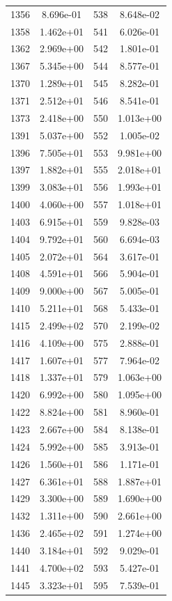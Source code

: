 \documentclass[12pt]{article}
\begin{document}
\begin{longtable}{@{}cccc@{}}
1356 & 8.696e-01 & 538 & 8.648e-02 \\
1358 & 1.462e+01 & 541 & 6.026e-01 \\
1362 & 2.969e+00 & 542 & 1.801e-01 \\
1367 & 5.345e+00 & 544 & 8.577e-01 \\
1370 & 1.289e+01 & 545 & 8.282e-01 \\
1371 & 2.512e+01 & 546 & 8.541e-01 \\
1373 & 2.418e+00 & 550 & 1.013e+00 \\
1391 & 5.037e+00 & 552 & 1.005e-02 \\
1396 & 7.505e+01 & 553 & 9.981e+00 \\
1397 & 1.882e+01 & 555 & 2.018e+01 \\
1399 & 3.083e+01 & 556 & 1.993e+01 \\
1400 & 4.060e+00 & 557 & 1.018e+01 \\
1403 & 6.915e+01 & 559 & 9.828e-03 \\
1404 & 9.792e+01 & 560 & 6.694e-03 \\
1405 & 2.072e+01 & 564 & 3.617e-01 \\
1408 & 4.591e+01 & 566 & 5.904e-01 \\
1409 & 9.000e+00 & 567 & 5.005e-01 \\
1410 & 5.211e+01 & 568 & 5.433e-01 \\
1415 & 2.499e+02 & 570 & 2.199e-02 \\
1416 & 4.109e+00 & 575 & 2.888e-01 \\
1417 & 1.607e+01 & 577 & 7.964e-02 \\
1418 & 1.337e+01 & 579 & 1.063e+00 \\
1420 & 6.992e+00 & 580 & 1.095e+00 \\
1422 & 8.824e+00 & 581 & 8.960e-01 \\
1423 & 2.667e+00 & 584 & 8.138e-01 \\
1424 & 5.992e+00 & 585 & 3.913e-01 \\
1426 & 1.560e+01 & 586 & 1.171e-01 \\
1427 & 6.361e+01 & 588 & 1.887e+01 \\
1429 & 3.300e+00 & 589 & 1.690e+00 \\
1432 & 1.311e+00 & 590 & 2.661e+00 \\
1436 & 2.465e+02 & 591 & 1.274e+00 \\
1440 & 3.184e+01 & 592 & 9.029e-01 \\
1441 & 4.700e+02 & 593 & 5.427e-01 \\
1445 & 3.323e+01 & 595 & 7.539e-01 \\

\end{longtable}
\end{document}
